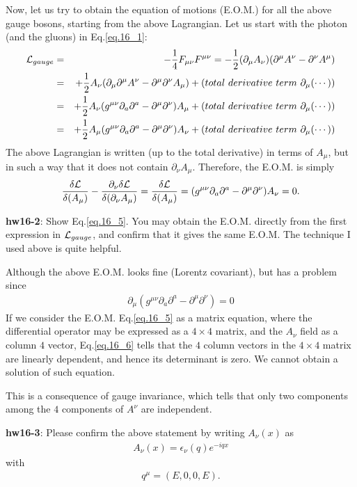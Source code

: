 \documentclass[12pt]{article}
\def\del{{\partial}}
\begin{document}
Now, let us try to obtain the equation of motions (E.O.M.) for all the above gauge bosons, starting from the above Lagrangian. Let us start
with the photon (and the gluons) in Eq.\ref{eq.16_1}:
\begin{eqnarray}
  {\cal L}_{gauge}
&=& -\frac{1}{4} F_{\mu\nu} F^{\mu\nu}
= -\frac{1}{2} (\del_\mu A_\nu) (\del^\mu A^\nu -\del^\nu A^\mu) \\
&=& +\frac{1}{2} A_\nu (\del_\mu \del^\mu A^\nu -\del^\mu \del^\nu A_\mu)
  + (total~derivative~ term~ \del_\mu (\cdots))\\
&=& +\frac{1}{2} A_\nu (g^{\mu\nu} \del_a \del^a -\del^\mu \del^\nu) A_\mu
  + (total~derivative ~term ~\del_\mu (\cdots))\\
&=& +\frac{1}{2} A_\mu (g^{\mu\nu} \del_a \del^a -\del^\mu \del^\nu) A_\nu
  + (total ~derivative ~term ~\del_\mu (\cdots)) \label{eq.16_4}
\end{eqnarray}
The above Lagrangian is written (up to the total derivative) in terms of $A_\mu$, but in such a way that it does not contain $\del_\nu A_\mu$.
Therefore, the E.O.M. is simply
\begin{eqnarray}
  \frac{\delta {\cal L}}{\delta(A_\mu)} -\frac{\del_\nu \delta {\cal L}}{\delta(\del_\nu A_\mu)}
=  \frac{\delta {\cal L}}{\delta(A_\mu)}
= (g^{\mu\nu} \del_a \del^a -\del^\mu \del^\nu) A_\nu
= 0. \label{eq.16_5}
\end{eqnarray}

{\bf hw16-2}: Show Eq.\ref{eq.16_5}. You may obtain the E.O.M. directly from the first
expression in ${\cal L}_{gauge}$, and confirm that it gives the same E.O.M.
The technique I used above is quite helpful.

Although the above E.O.M. looks fine (Lorentz covariant), but has a
problem since
\begin{eqnarray}
  \del_\mu (g^{\mu\nu} \del_a \del^a -\del^\mu \del^\nu) = 0\label{eq.16_6}
\end{eqnarray}
If we consider the E.O.M. Eq.\ref{eq.16_5} as a matrix equation, where the
differential operator may be expressed as a $4\times 4$ matrix, and the
$A_\nu$ field as a column $4$ vector, Eq.\ref{eq.16_6} tells that the $4$ column vectors in the $4\times 4$ matrix are linearly dependent, and hence its
determinant is zero. We cannot obtain a solution of such equation.

This is a consequence of gauge invariance, which tells that only two
components among the $4$ components of $A^\nu$ are independent.

{\bf hw16-3}: Please confirm the above statement by writing $A_\nu(x)$ as
\begin{eqnarray}
  A_\nu(x) = \epsilon_\nu(q) e^{-iqx} \label{eq.16_7}
\end{eqnarray}
with
\begin{eqnarray}
  q^\mu = (E,0,0,E). \label{eq.16_8}
\end{eqnarray}
\end{document}
